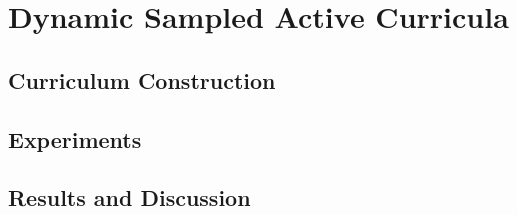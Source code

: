 \chapter{Dynamic Sampled Active Curricula}
\section{Curriculum Construction}

\section{Experiments}

\section{Results and Discussion}